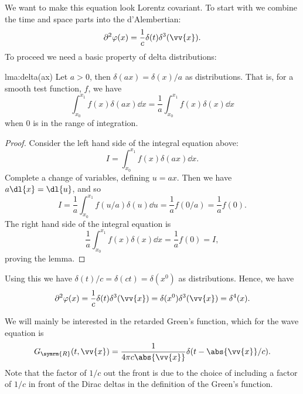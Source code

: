 \documentclass[fleqn]{NotesClass}
\newcommand*{\dalembertian}{\partial^2}
\begin{document}
    We want to make this equation look Lorentz covariant.
    To start with we combine the time and space parts into the d'Alembertian:
    \begin{equation}
        \dalembertian \varphi(x) = \frac{1}{c} \delta(t) \delta^3(\vv{x}).
    \end{equation}
    To proceed we need a basic property of delta distributions:
    \begin{lma}{}{lma:delta(ax)}
        Let \(a > 0\), then \(\delta(ax) = \delta(x)/a\) as distributions.
        That is, for a smooth test function, \(f\), we have
        \begin{equation}
            \int_{x_0}^{x_1} f(x) \delta(ax) \dd{x} = \frac{1}{a} \int_{x_0}^{x_1} f(x) \delta(x) \dd{x}
        \end{equation}
        when \(0\) is in the range of integration.
        
        \begin{proof}
            Consider the left hand side of the integral equation above:
            \begin{equation}
                I = \int_{x_0}^{x_1} f(x) \delta(ax) \dd{x}.
            \end{equation}
            Complete a change of variables, defining \(u = ax\).
            Then we have \(a\dl{x} = \dl{u}\), and so 
            \begin{equation}
                I = \frac{1}{a} \int_{x_0}^{x_1} f(u/a) \delta(u) \dd{u} = \frac{1}{a} f(0/a) = \frac{1}{a} f(0).
            \end{equation}
            The right hand side of the integral equation is
            \begin{equation}
                \frac{1}{a} \int_{x_0}^{x_1} f(x) \delta(x) \dd{x} = \frac{1}{a} f(0) = I,
            \end{equation}
            proving the lemma.
        \end{proof}
    \end{lma}
    
    Using this we have \(\delta(t)/c = \delta(ct) = \delta(x^0)\) as distributions.
    Hence, we have
    \begin{equation}
        \dalembertian \varphi(x) = \frac{1}{c} \delta(t) \delta^3(\vv{x}) = \delta(x^0)\delta^3(\vv{x}) = \delta^4(x).
    \end{equation}
    
    We will mainly be interested in the retarded Green's function, which for the wave equation is
    \begin{equation}
        G_{\symrm{R}}(t, \vv{x}) = \frac{1}{4\pi c \abs{\vv{x}}} \delta(t - \abs{\vv{x}}/c).
    \end{equation}
    Note that the factor of \(1/c\) out the front is due to the choice of including a factor of \(1/c\) in front of the Dirac deltas in the definition of the Green's function.
    
\end{document}
